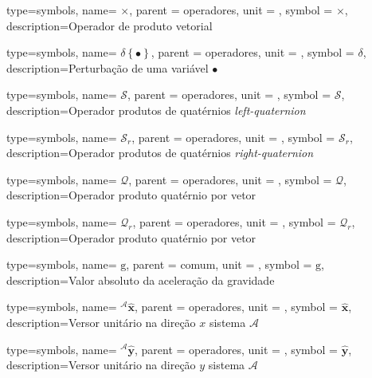 {type=symbols,
  name= \ensuremath{\times},
  parent = {operadores},
  unit = {},
  symbol = \ensuremath{\times},
  description={Operador de produto vetorial}
}

{type=symbols,
  name= \ensuremath{\delta\left\{\bullet\right\}},
  parent = {operadores},
  unit = {},
  symbol = \ensuremath{\delta},
  description={Perturbação de uma variável \ensuremath{\bullet}}
}


{type=symbols,
  name= \ensuremath{\boldsymbol{\mathcal{S}}},
  parent = {operadores},
  unit = \unexpanded{},
  symbol = \ensuremath{\boldsymbol{\mathcal{S}}},
  description={Operador produtos de quatérnios \emph{left-quaternion}}
}

{type=symbols,
  name= \ensuremath{\boldsymbol{\mathcal{S}}_{r}},
  parent = {operadores},
  unit = \unexpanded{},
  symbol = \ensuremath{\boldsymbol{\mathcal{S}}_{r}},
  description={Operador produtos de quatérnios \emph{right-quaternion}}
}

{type=symbols,
  name= \ensuremath{\boldsymbol{\mathcal{Q}}},
  parent = {operadores},
  unit = \unexpanded{},
  symbol = \ensuremath{\boldsymbol{\mathcal{Q}}},
  description={Operador produto quatérnio por vetor}
}

{type=symbols,
  name= \ensuremath{\boldsymbol{\mathcal{Q}}_{r}},
  parent = {operadores},
  unit = \unexpanded{},
  symbol = \ensuremath{\boldsymbol{\mathcal{Q}}_{r}},
  description={Operador produto quatérnio por vetor}
}

{type=symbols,
  name= \ensuremath{\mathrm{g}},
  parent = {comum},
  unit = \unexpanded{\si{\meter\per\second\squared}},
  symbol = \ensuremath{\mathrm{g}},
  description={Valor absoluto da aceleração da gravidade}
}

{type=symbols,
  name= \ensuremath{{}^{\scriptscriptstyle{\mathcal{A}}}\hat{\boldsymbol{x}}},
  parent = {operadores},
  unit = \unexpanded{},
  symbol = \ensuremath{\hat{\boldsymbol{x}}},
  description={Versor unitário na direção \ensuremath{x} sistema \ensuremath{\mathcal{A}}}
}

{type=symbols,
  name= \ensuremath{{}^{\scriptscriptstyle{\mathcal{A}}}\hat{\boldsymbol{y}}},
  parent = {operadores},
  unit = \unexpanded{},
  symbol = \ensuremath{\hat{\boldsymbol{y}}},
  description={Versor unitário na direção \ensuremath{y} sistema  \ensuremath{\mathcal{A}}}
}

